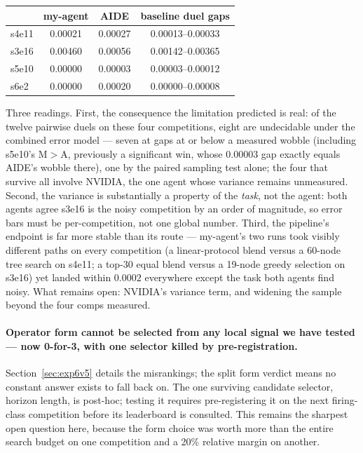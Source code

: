 \documentclass[11pt,a4paper]{article}
\begin{document}
\begin{center}\small
\begin{tabular}{@{}lccc@{}}
\toprule
 & \textbf{my-agent} & \textbf{AIDE} & \textbf{baseline duel gaps} \\
\midrule
s4e11 & 0.00021 & 0.00027 & 0.00013--0.00033 \\
s3e16 & 0.00460 & 0.00056 & 0.00142--0.00365 \\
s5e10 & 0.00000 & 0.00003 & 0.00003--0.00012 \\
s6e2  & 0.00000 & 0.00020 & 0.00000--0.00008 \\
\bottomrule
\end{tabular}
\end{center}

Three readings. First, the consequence the limitation predicted is real: of the twelve
pairwise duels on these four competitions, eight are undecidable under the combined error
model --- seven at gaps at or below a measured wobble (including s5e10's M${>}$A, previously
a significant win, whose $0.00003$ gap exactly equals AIDE's wobble there), one by the
paired sampling test alone; the four that survive all involve NVIDIA, the one agent whose
variance remains unmeasured. Second, the variance is substantially a property of the
\emph{task}, not the agent: both agents agree s3e16 is the noisy competition by an order of
magnitude, so error bars must be per-competition, not one global number. Third, the
pipeline's endpoint is far more stable than its route --- my-agent's two runs took visibly
different paths on every competition (a linear-protocol blend versus a 60-node tree search
on s4e11; a top-30 equal blend versus a 19-node greedy selection on s3e16) yet landed
within $0.0002$ everywhere except the task both agents find noisy. What remains open:
NVIDIA's variance term, and widening the sample beyond the four comps measured.

\paragraph{Operator form cannot be selected from any local signal we have tested --- now
0-for-3, with one selector killed by pre-registration.} Section~\ref{sec:exp6v5} details the
misrankings; the split form verdict means no constant answer exists to fall back on. The one
surviving candidate selector, horizon length, is post-hoc; testing it requires pre-registering
it on the next firing-class competition before its leaderboard is consulted. This remains the
sharpest open question here, because the form choice was worth more than the entire search
budget on one competition and a 20\% relative margin on another.
\end{document}
